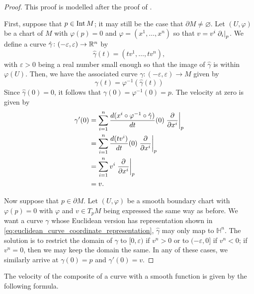 \documentclass[a4paper,12pt]{article}
\begin{document}
\begin{proof}
    This proof is modelled after the proof of \cite[Prop.~3.23]{Lee2012}.

    First, suppose that $p \in \operatorname{Int} M$; it may still be the case that $\partial M \neq \varnothing$.
    Let $(U, \varphi)$ be a chart of $M$ with $\varphi(p) = 0$ and $\varphi = (x^1, \ldots, x^n)$ so that $v = v^i \eval{\partial_i}{p}$.
    We define a curve $\hat{\gamma} \colon (-\varepsilon, \varepsilon) \to \mathbb{R}^n$ by
    \begin{equation}\label{eq:euclidean_curve_coordinate_representation}
        \hat{\gamma}(t) = (tv^1, \ldots, tv^n),
    \end{equation}
    with $\varepsilon > 0$ being a real number small enough so that the image of $\hat{\gamma}$ is within $\varphi(U)$.
    Then, we have the associated curve $\gamma \colon (-\varepsilon, \varepsilon) \to M$ given by
    \begin{equation*}
        \gamma(t) = \varphi^{-1}(\hat{\gamma}(t))
    \end{equation*}
    Since $\hat{\gamma}(0) = 0$, it follows that $\gamma(0) = \varphi^{-1}(0) = p$.
    The velocity at zero is given by
    \begin{align*}
        \gamma'(0) &= \sum_{i=1}^n \frac{d(x^i \circ \varphi^{-1} \circ \hat{\gamma})}{dt}(0) \eval{\frac{\partial}{\partial x^i}}{p} \\
        &= \sum_{i=1}^n \frac{d(tv^i)}{dt}(0) \eval{\frac{\partial}{\partial x^i}}{p} \\
        &= \sum_{i=1}^n v^i \eval{\frac{\partial}{\partial x^i}}{p} \\
        &= v.
    \end{align*}
    
    Now suppose that $p \in \partial M$.
    Let $(U, \varphi)$ be a smooth boundary chart with $\varphi(p) = 0$ with $\varphi$ and $v \in T_p M$ being expressed the same way as before.
    We want a curve $\gamma$ whose Euclidean version has representation shown in \eqref{eq:euclidean_curve_coordinate_representation}, $\hat{\gamma}$ may only map to $\mathbb{H}^n$.
    The solution is to restrict the domain of $\hat{\gamma}$ to $[0, \varepsilon)$ if $v^n > 0$ or to $(-\varepsilon, 0]$ if $v^n < 0$; if $v^n = 0$, then we may keep the domain the same.
    In any of these cases, we similarly arrive at $\gamma(0) = p$ and $\gamma'(0) = v$.
\end{proof}
The velocity of the composite of a curve with a smooth function is given by the following formula.
\end{document}

